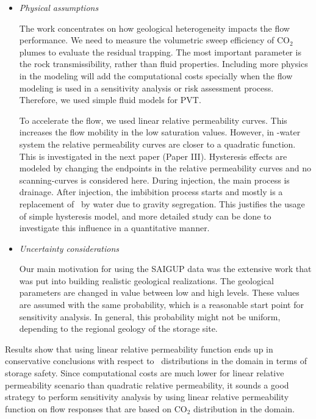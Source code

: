 {\begin{itemize}
\item \textit{Physical assumptions}
 
The work concentrates on how geological heterogeneity impacts the flow
performance. We need to measure the volumetric sweep efficiency of $\mbox{CO}_2$
plumes to evaluate the residual trapping. The most important parameter
is the rock transmissibility, rather than fluid properties. Including more
physics in the modeling will add the computational costs specially when the flow
modeling is used in a sensitivity analysis or risk assessment process.
Therefore, we used simple fluid models for PVT. 

To accelerate the flow, we used linear relative permeability curves. This
increases the flow mobility in the low saturation values. However, in \coo-water system the relative permeability curves are closer to a quadratic function. This is investigated in the next paper (Paper III). Hysteresis effects are
modeled by changing the endpoints in the relative permeability curves and no
scanning-curves is considered here. During injection, the main process is
drainage. After injection, the imbibition process starts and mostly is a
replacement of \coo\ by water due to gravity segregation. This justifies
the usage of simple hysteresis model, and more detailed study can be done to
investigate this influence in a quantitative manner. 

\item \textit{Uncertainty considerations}

Our main motivation for using the SAIGUP data was the extensive work that was put into building realistic geological realizations. The geological parameters are changed in value between low and high levels. These values are assumed with the same probability, which is a reasonable start point for sensitivity analysis. In general, this probability might not be uniform, depending to the regional geology of the storage site. 

\end{itemize}
Results show that using linear relative permeability function ends up in
conservative conclusions with respect to \coo\ distributions in the
domain in terms of storage safety. Since computational costs are much lower for
linear relative permeability scenario than quadratic relative permeability, it
sounds a good strategy to perform sensitivity analysis by using linear relative
permeability function on flow responses that are based on $\mbox{CO}_2$
distribution in the domain.

}
